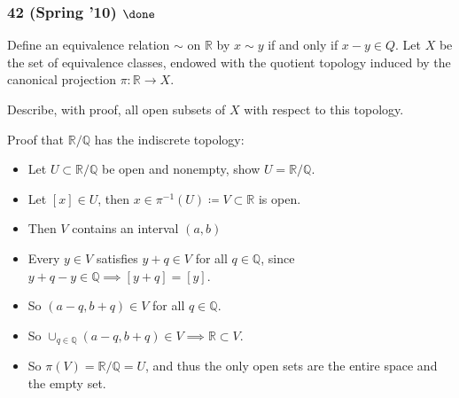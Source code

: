 \hypertarget{spring-10-done-1}{%
\subsubsection{\texorpdfstring{42 (Spring '10)
\(\done\)}{42 (Spring '10) \textbackslash done}}\label{spring-10-done-1}}

\begin{problem}[?]

Define an equivalence relation \(\sim\) on \({\mathbb{R}}\) by
\(x \sim y\) if and only if \(x - y \in Q\). Let \(X\) be the set of
equivalence classes, endowed with the quotient topology induced by the
canonical projection \(\pi : {\mathbb{R}}\to X\).

Describe, with proof, all open subsets of \(X\) with respect to this
topology.

\end{problem}

\begin{solution}

\envlist

\begin{concept}

\envlist

\end{concept}

Proof that \({\mathbb{R}}/{\mathbb{Q}}\) has the indiscrete topology:

\begin{itemize}
\tightlist
\item
  Let \(U \subset {\mathbb{R}}/{\mathbb{Q}}\) be open and nonempty, show
  \(U = {\mathbb{R}}/{\mathbb{Q}}\).
\item
  Let \([x] \in U\), then
  \(x \in \pi^{-1}(U) \coloneqq V \subset{\mathbb{R}}\) is open.
\item
  Then \(V\) contains an interval \((a, b)\)
\item
  Every \(y\in V\) satisfies \(y+q \in V\) for all
  \(q\in {\mathbb{Q}}\), since
  \(y+q-y \in {\mathbb{Q}}\implies [y+q] = [y]\).
\item
  So \((a-q, b+q) \in V\) for all \(q\in {\mathbb{Q}}\).
\item
  So
  \(\cup_{q\in {\mathbb{Q}}}(a-q, b+q) \in V \implies {\mathbb{R}}\subset V\).
\item
  So \(\pi(V) = {\mathbb{R}}/{\mathbb{Q}}= U\), and thus the only open
  sets are the entire space and the empty set.
\end{itemize}

\end{solution}

